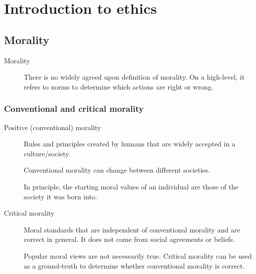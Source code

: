 \chapter{Introduction to ethics}



\section{Morality}

\begin{description}
    \item[Morality] 
        There is no widely agreed upon definition of morality. On a high-level, it refers to norms to determine which actions are right or wrong.  
\end{description}


\subsection{Conventional and critical morality}

\begin{description}
    \item[Positive (conventional) morality] 
        Rules and principles created by humans that are widely accepted in a culture/society.

        \begin{remark}
            Conventional morality can change between different societies.
        \end{remark}
        
        \begin{remark}
            In principle, the starting moral values of an individual are those of the society it was born into.
        \end{remark}

    \item[Critical morality] 
        Moral standards that are independent of conventional morality and are correct in general. It does not come from social agreements or beliefs.

        \begin{remark}
            Popular moral views are not necessarily true. Critical morality can be used as a ground-truth to determine whether conventional morality is correct.
        \end{remark}
\end{description}


